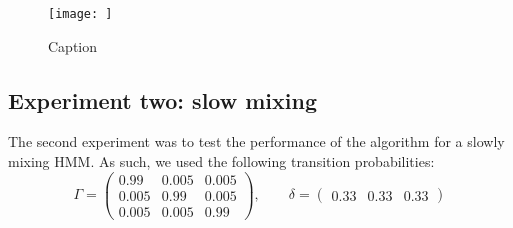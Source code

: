 \begin{figure}
    \centering
    \texttt{[image: ]}
    \caption{Caption}
    \label{fig:my_label}
\end{figure}


\subsection{Experiment two: slow mixing}

The second experiment was to test the performance of the algorithm for a slowly mixing HMM. As such, we used the following transition probabilities:
%
\begin{equation*}
    \Gamma = 
    \begin{pmatrix} 
        0.99 & 0.005 & 0.005 \\
        0.005 & 0.99 & 0.005 \\
        0.005 & 0.005 & 0.99
    \end{pmatrix},
    \qquad
    \delta = \begin{pmatrix} 0.33 & 0.33 & 0.33 \end{pmatrix}
\end{equation*}
%